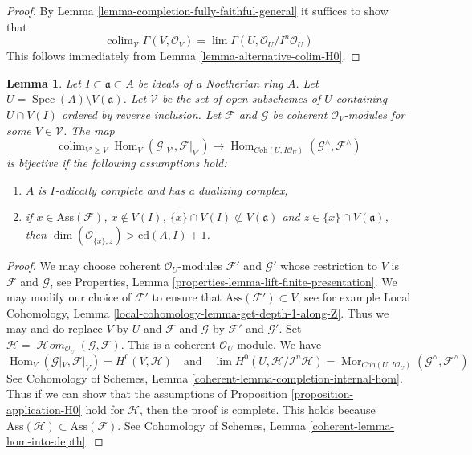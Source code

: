 \documentclass{stacks-project}
\theoremstyle{plain}
\newtheorem{lemma}[subsection]{Lemma}
\theoremstyle{definition}
\theoremstyle{remark}
\numberwithin{equation}{subsection}
\def\lim{\mathop{\mathrm{lim}}\nolimits}
\def\colim{\mathop{\mathrm{colim}}\nolimits}
\def\Spec{\mathop{\mathrm{Spec}}}
\def\Hom{\mathop{\mathrm{Hom}}\nolimits}
\def\SheafHom{\mathop{\mathcal{H}\!\mathit{om}}\nolimits}
\def\Mor{\mathop{\mathrm{Mor}}\nolimits}
\begin{document}
\begin{proof}
By Lemma \ref{lemma-completion-fully-faithful-general}
it suffices to show that
$$
\colim_\mathcal{V} \Gamma(V, \mathcal{O}_V) =
\lim \Gamma(U, \mathcal{O}_U/I^n\mathcal{O}_U)
$$
This follows immediately from Lemma \ref{lemma-alternative-colim-H0}.
\end{proof}

\begin{lemma}
\label{lemma-fully-faithful-very-general}
Let $I \subset \mathfrak a \subset A$ be ideals of a Noetherian ring $A$.
Let $U = \Spec(A) \setminus V(\mathfrak a)$. Let $\mathcal{V}$ be the set
of open subschemes of $U$ containing $U \cap V(I)$ ordered by reverse
inclusion. Let $\mathcal{F}$ and
$\mathcal{G}$ be coherent $\mathcal{O}_V$-modules for some
$V \in \mathcal{V}$. The map
$$
\colim_{V' \geq V} \Hom_V(\mathcal{G}|_{V'}, \mathcal{F}|_{V'})
\longrightarrow
\Hom_{\textit{Coh}(U, I\mathcal{O}_U)}(\mathcal{G}^\wedge, \mathcal{F}^\wedge)
$$
is bijective if the following assumptions hold:
\begin{enumerate}
\item $A$ is $I$-adically complete and has a dualizing complex,
\item if $x \in \text{Ass}(\mathcal{F})$, $x \not \in V(I)$,
$\overline{\{x\}} \cap V(I) \not \subset V(\mathfrak a)$
and $z \in \overline{\{x\}} \cap V(\mathfrak a)$, then
$\dim(\mathcal{O}_{\overline{\{x\}}, z}) > \text{cd}(A, I) + 1$.
\end{enumerate}
\end{lemma}

\begin{proof}
We may choose coherent $\mathcal{O}_U$-modules
$\mathcal{F}'$ and $\mathcal{G}'$ whose restriction to $V$
is $\mathcal{F}$ and $\mathcal{G}$, see
Properties, Lemma \ref{properties-lemma-lift-finite-presentation}.
We may modify our choice of $\mathcal{F}'$ to ensure that
$\text{Ass}(\mathcal{F}') \subset V$, see for example
Local Cohomology, Lemma \ref{local-cohomology-lemma-get-depth-1-along-Z}.
Thus we may and do replace $V$ by $U$ and $\mathcal{F}$ and $\mathcal{G}$
by $\mathcal{F}'$ and $\mathcal{G}'$.
Set $\mathcal{H} = \SheafHom_{\mathcal{O}_U}(\mathcal{G}, \mathcal{F})$.
This is a coherent $\mathcal{O}_U$-module. We have
$$
\Hom_V(\mathcal{G}|_V, \mathcal{F}|_V) =
H^0(V, \mathcal{H})
\quad\text{and}\quad
\lim H^0(U, \mathcal{H}/\mathcal{I}^n\mathcal{H}) =
\Mor_{\textit{Coh}(U, I\mathcal{O}_U)}
(\mathcal{G}^\wedge, \mathcal{F}^\wedge)
$$
See Cohomology of Schemes, Lemma \ref{coherent-lemma-completion-internal-hom}.
Thus if we can show that the assumptions of
Proposition \ref{proposition-application-H0}
hold for $\mathcal{H}$, then the proof is complete.
This holds because
$\text{Ass}(\mathcal{H}) \subset \text{Ass}(\mathcal{F})$.
See Cohomology of Schemes, Lemma
\ref{coherent-lemma-hom-into-depth}.
\end{proof}
\end{document}
